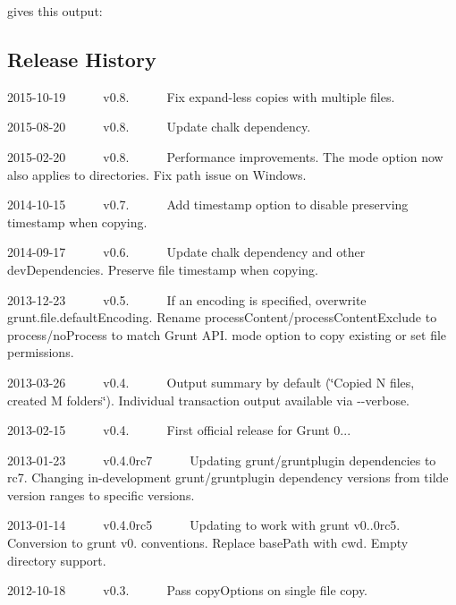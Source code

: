gives this output\+:




\subsection*{Release History}


\begin{DoxyItemize}
\item 2015-\/10-\/19   v0.8.   \+Fix expand-\/less copies with multiple files.
\item 2015-\/08-\/20   v0.8.   \+Update {\ttfamily chalk} dependency.
\item 2015-\/02-\/20   v0.8.   \+Performance improvements. The {\ttfamily mode} option now also applies to directories. Fix path issue on Windows.
\item 2014-\/10-\/15   v0.7.   \+Add timestamp option to disable preserving timestamp when copying.
\item 2014-\/09-\/17   v0.6.   \+Update chalk dependency and other dev\+Dependencies. Preserve file timestamp when copying.
\item 2013-\/12-\/23   v0.5.   \+If an encoding is specified, overwrite grunt.\+file.\+default\+Encoding. Rename process\+Content/process\+Content\+Exclude to process/no\+Process to match Grunt A\+PI. mode option to copy existing or set file permissions.
\item 2013-\/03-\/26   v0.4.   \+Output summary by default (\char`\"{}\+Copied N files, created M folders\char`\"{}). Individual transaction output available via {\ttfamily -\/-\/verbose}.
\item 2013-\/02-\/15   v0.4.   \+First official release for Grunt 0...
\item 2013-\/01-\/23   v0.4.\+0rc7   \+Updating grunt/gruntplugin dependencies to rc7. Changing in-\/development grunt/gruntplugin dependency versions from tilde version ranges to specific versions.
\item 2013-\/01-\/14   v0.4.\+0rc5   \+Updating to work with grunt v0..\+0rc5. Conversion to grunt v0. conventions. Replace base\+Path with cwd. Empty directory support.
\item 2012-\/10-\/18   v0.3.   \+Pass copy\+Options on single file copy.

\end{DoxyItemize}
